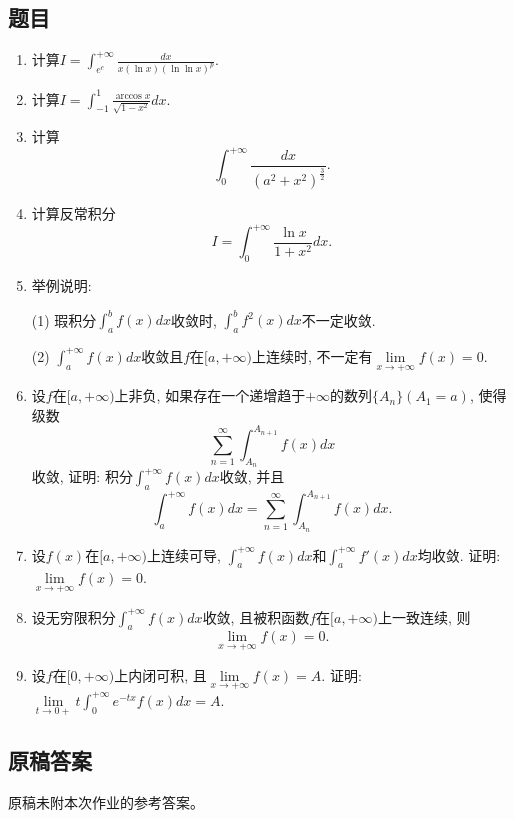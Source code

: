 \documentclass[UTF8,11pt, a4paper, oneside, fontset=none]{ctexbook}
\begin{document}
\subsection*{题目}
\begin{enumerate}

\item 计算$I = \int_{e^e}^{+\infty} \frac{dx}{x (\ln x)(\ln \ln x)^p}$.

\item 计算$I = \int_{-1}^1 \frac{\arccos x}{\sqrt{1 - x^2}}dx$.

\item 计算
\[
\int_0^{+\infty} \frac{dx}{(a^2 + x^2)^{\frac{3}{2}}}.
\]

\item 计算反常积分
\[
I = \int_0^{+\infty} \frac{\ln x}{1 + x^2} dx.
\]

\item 举例说明:

(1) 瑕积分$\int_a^b f(x) dx$收敛时, $\int_a^b f^2(x) dx$不一定收敛.

(2) $\int_a^{+\infty} f(x) dx$收敛且$f$在$[a, +\infty)$上连续时, 不一定有$\lim\limits_{x \to +\infty} f(x) =0$.

\item 设$f$在$[a, +\infty)$上非负, 如果存在一个递增趋于$+\infty$的数列$\{ A_n \} (A_1 = a)$, 使得级数
\[
\sum_{n=1}^{\infty} \int_{A_n}^{A_{n+1}} f(x) dx
\] 
收敛, 证明: 积分$\int_a^{+\infty} f(x) dx$收敛, 并且
\[
\int_a^{+\infty} f(x) dx = \sum_{n=1}^{\infty} \int_{A_n}^{A_{n+1}} f(x) dx.
\]

\item 设$f(x)$在$[a, +\infty)$上连续可导, $\int_a^{+\infty} f(x) dx$和$\int_a^{+\infty} f'(x) dx$均收敛. 证明: $\lim\limits_{x \to +\infty} f(x) =0$.

\item 设无穷限积分$\int_a^{+\infty} f(x) dx$收敛, 且被积函数$f$在$[a, +\infty)$上一致连续, 则
\[
\lim_{x \to +\infty} f(x) =0.
\]

\item 设$f$在$[0, +\infty)$上内闭可积, 且$\lim\limits_{x \to +\infty} f(x) =A$. 证明: $\lim\limits_{t \to 0+} t \int_0^{+\infty} e^{-tx} f(x) dx= A$.

\end{enumerate}
\clearpage
\subsection*{原稿答案}
\noindent 原稿未附本次作业的参考答案。
\clearpage
\end{document}
